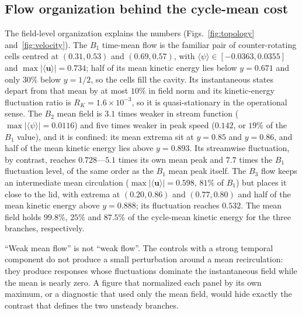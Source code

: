 \documentclass[11pt,a4paper]{article}
\begin{document}
\subsection{Flow organization behind the cycle-mean cost}
\label{sec:topology}

The field-level organization explains the numbers (Figs.~\ref{fig:topology}
and~\ref{fig:velocity}). The $B_1$ time-mean flow is the familiar pair of
counter-rotating cells centred at $(0.31,0.53)$ and $(0.69,0.57)$, with
$\langle\psi\rangle\in[-0.0363,0.0355]$ and $\max|\langle\mathbf{u}\rangle|=0.734$;
half of its mean kinetic energy lies below $y=0.671$ and only $30\%$ below
$y=1/2$, so the cells fill the cavity. Its instantaneous states depart from that
mean by at most $10\%$ in field norm and its kinetic-energy fluctuation ratio is
$R_K=1.6\times10^{-3}$, so it is quasi-stationary in the operational sense. The
$B_2$ mean field is $3.1$ times weaker in stream function
($\max|\langle\psi\rangle|=0.0116$) and five times weaker in peak speed ($0.142$,
or $19\%$ of the $B_1$ value), and it is confined: its mean extrema sit at
$y=0.85$ and $y=0.86$, and half of the mean kinetic energy lies above $y=0.893$.
Its streamwise fluctuation, by contrast, reaches $0.728$---$5.1$ times its own mean
peak and $7.7$ times the $B_1$ fluctuation level, of the same order as the
$B_1$ mean peak itself. The $B_3$ flow keeps an intermediate mean circulation
($\max|\langle\mathbf{u}\rangle|=0.598$, $81\%$ of $B_1$) but places it close to
the lid, with extrema at $(0.20,0.86)$ and $(0.77,0.80)$ and half of the mean
kinetic energy above $y=0.888$; its fluctuation reaches $0.532$. The mean field
holds $99.8\%$, $25\%$ and $87.5\%$ of the cycle-mean kinetic energy for the three
branches, respectively.

``Weak mean flow'' is not ``weak flow''. The controls with a strong
temporal component do not produce a small perturbation around a mean
recirculation: they produce responses whose fluctuations dominate the
instantaneous field while the mean is nearly zero. A figure that normalized each
panel by its own maximum, or a diagnostic that used only the mean field, would
hide exactly the contrast that defines the two unsteady branches.
\end{document}
